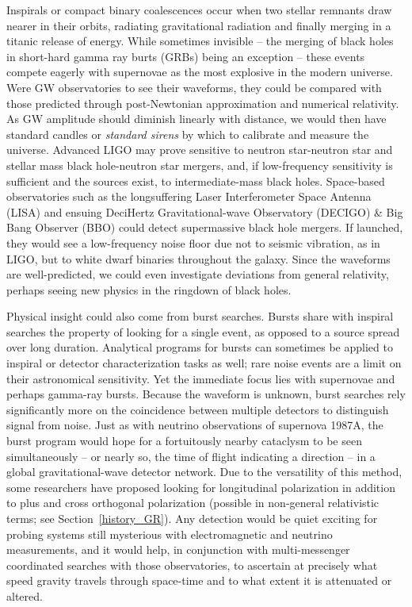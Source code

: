 Inspirals or compact binary coalescences occur when two stellar remnants draw nearer in their orbits, radiating gravitational radiation and finally merging in a titanic release of energy. 
While sometimes invisible -- the merging of black holes in short-hard gamma ray burts (GRBs) being an exception -- these events compete eagerly with supernovae as the most explosive in the modern universe. 
Were GW observatories to see their waveforms, they could be compared with those predicted through post-Newtonian approximation and numerical relativity. 
As GW amplitude should diminish linearly with distance, we would then have standard candles or \textit{standard sirens} by which to calibrate and measure the universe. 
Advanced LIGO may prove sensitive to neutron star-neutron star and stellar mass black hole-neutron star mergers, and, if low-frequency sensitivity is sufficient and the sources exist, to intermediate-mass black holes. 
Space-based observatories such as the longsuffering Laser Interferometer Space Antenna (LISA) and ensuing DeciHertz Gravitational-wave Observatory (DECIGO) \& Big Bang Observer (BBO) could detect supermassive black hole mergers. If launched, they would see a low-frequency noise floor due not to seismic vibration, as in LIGO, but to white dwarf binaries throughout the galaxy. 
Since the waveforms are well-predicted, we could even investigate deviations from general relativity, perhaps seeing new physics in the ringdown of black holes.

Physical insight could also come from burst searches. 
Bursts share with inspiral searches the property of looking for a single event, as opposed to a source spread over long duration. 
Analytical programs for bursts can sometimes be applied to inspiral or detector characterization tasks as well; rare noise events are a limit on their astronomical sensitivity.
Yet the immediate focus lies with supernovae and perhaps gamma-ray bursts. 
Because the waveform is unknown, burst searches rely significantly more on the coincidence between multiple detectors to distinguish signal from noise. 
Just as with neutrino observations of supernova 1987A, the burst program would hope for a fortuitously nearby cataclysm to be seen simultaneously -- or nearly so, the time of flight indicating a direction -- in a global gravitational-wave detector network. 
Due to the versatility of this method, some researchers have proposed looking for longitudinal polarization in addition to plus and cross orthogonal polarization (possible in non-general relativistic terms; see Section~\ref{history_GR}). 
Any detection would be quiet exciting for probing systems still mysterious with electromagnetic and neutrino measurements, and it would help, in conjunction with multi-messenger coordinated searches with those observatories, to ascertain at precisely what speed gravity travels through space-time and to what extent it is attenuated or altered.


